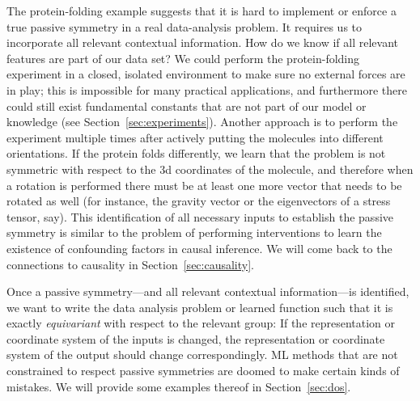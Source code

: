 \documentclass{article}
\theoremstyle{plain}
\theoremstyle{definition}
\theoremstyle{remark}
\newcommand{\sectionname}{Section}
\newcommand{\secref}[1]{\sectionname~\ref{#1}}
\begin{document}
The protein-folding example suggests that it is hard to implement or enforce a true passive symmetry in a real data-analysis problem.
It requires us to incorporate all relevant contextual information.
How do we know if all relevant features are part of our data set?
We could perform the protein-folding experiment in a closed, isolated environment to make sure no external forces are in play;
this is impossible for many practical applications, and furthermore there could still exist fundamental constants that are not part of our model or knowledge (see \secref{sec:experiments}).
Another approach is to perform the experiment multiple times after actively putting the molecules into different orientations.
If the protein folds differently, we learn that the problem is not symmetric with respect to the 3d coordinates of the molecule, and therefore when a rotation is performed there must be at least one more vector that needs to be rotated as well (for instance, the gravity vector or the eigenvectors of a stress tensor, say).
This identification of all necessary inputs to establish the passive symmetry is similar to the problem of performing interventions to learn the existence of confounding factors in causal inference.
We will come back to the connections to causality in \secref{sec:causality}.

Once a passive symmetry---and all relevant contextual information---is identified, we want to write the data analysis problem or learned function such that it is exactly \emph{equivariant} with respect to the relevant group:
If the representation or coordinate system of the inputs is changed, the representation or coordinate system of the output should change correspondingly.
ML methods that are not constrained to respect passive symmetries are doomed to make certain kinds of mistakes.
We will provide some examples thereof in \secref{sec:dos}.
\end{document}
